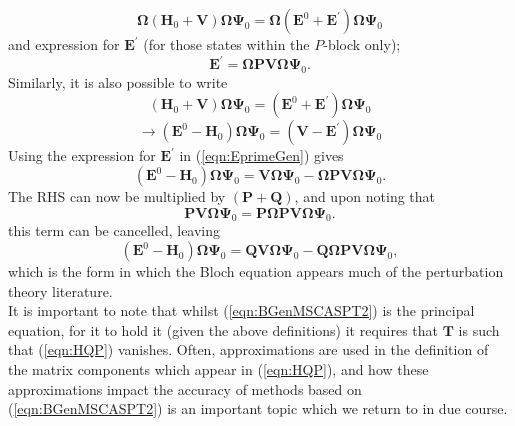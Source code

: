 \documentclass[12pt]{article}
\begin{document}
\begin{equation}
\boldsymbol{\Omega}(\mathbf{H}_{0}+\mathbf{V})\boldsymbol{\Omega}\mathbf{\Psi}_{0} =
\boldsymbol{\Omega}(\mathbf{E}^{0}+\mathbf{E}^{'})\boldsymbol{\Omega}\mathbf{\Psi}_{0}
\label{eqn:WWperturbedHE}
\end{equation}
and expression for $\mathbf{E}^{'}$ (for those states within the $P$-block only);
\begin{equation}
\mathbf{E}^{'} = \boldsymbol{\Omega}\mathbf{P}\mathbf{V}\boldsymbol{\Omega}\mathbf{\Psi}_{0}.
\label{eqn:EprimeGen}
\end{equation}
Similarly, it is also possible to write
\begin{equation*}
(\mathbf{H}_{0}+\mathbf{V})\boldsymbol{\Omega}\mathbf{\Psi}_{0} =
(\mathbf{E}^{0}+\mathbf{E}^{'})\boldsymbol{\Omega}\mathbf{\Psi}_{0}
\end{equation*}
\begin{equation}
\rightarrow
(\mathbf{E}^{0}-\mathbf{H}_{0})\boldsymbol{\Omega}\mathbf{\Psi}_{0} =
 (\mathbf{V}-\mathbf{E}^{'})\boldsymbol{\Omega}\mathbf{\Psi}_{0} 
\label{eqn:WperturbedHE}
\end{equation}
Using the expression for $\mathbf{E}^{'}$ in  (\ref{eqn:EprimeGen}) gives
\begin{equation}
(\mathbf{E}^{0}-\mathbf{H}_{0})\boldsymbol{\Omega}\mathbf{\Psi}_{0} =
\mathbf{V}\boldsymbol{\Omega}\mathbf{\Psi}_{0} - 
\boldsymbol{\Omega}\mathbf{P}\mathbf{V}\boldsymbol{\Omega}\mathbf{\Psi}_{0}.
\label{eqn:BGenIntermediate}
\end{equation}
The RHS can now be multiplied by $(\mathbf{P}+\mathbf{Q})$,  and upon noting that
\begin{equation*}
\mathbf{P}\mathbf{V}\boldsymbol{\Omega}\mathbf{\Psi}_{0} = \mathbf{P}\boldsymbol{\Omega}\mathbf{P}\mathbf{V}\boldsymbol{\Omega}\mathbf{\Psi}_{0}.
\end{equation*}
this term can be cancelled, leaving
\begin{equation}
(\mathbf{E}^{0}-\mathbf{H}_{0})\boldsymbol{\Omega}\mathbf{\Psi}_{0} =
\mathbf{Q}\mathbf{V}\boldsymbol{\Omega}\mathbf{\Psi}_{0} - 
\mathbf{Q}\boldsymbol{\Omega}\mathbf{P}\mathbf{V}\boldsymbol{\Omega}\mathbf{\Psi}_{0},
\label{eqn:BGenMSCASPT2}
\end{equation}
which is the form in which the Bloch equation appears much of the perturbation theory literature.\\

\noindent It is important to note that whilst (\ref{eqn:BGenMSCASPT2}) is the principal equation,
for it to hold it (given the above definitions) it requires that $\mathbf{T}$ is such that
(\ref{eqn:HQP}) vanishes. Often, approximations are used in the definition of the matrix components
which appear in (\ref{eqn:HQP}), and how these approximations impact the accuracy of methods based on
(\ref{eqn:BGenMSCASPT2}) is an important topic which we return to in due course.
\end{document}
